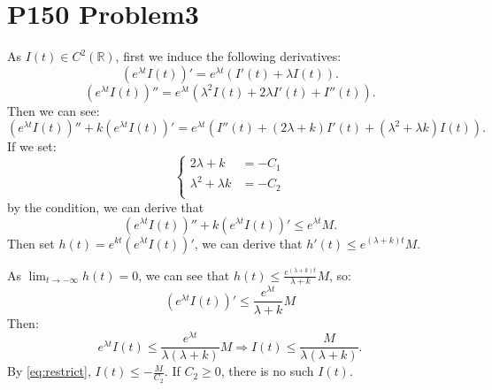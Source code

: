 \documentclass[a4paper]{ctexart}
\begin{document}
\section*{P150 Problem3}
As $I(t)\in C^{2}(\mathbb{R})$, first we induce the following derivatives:
\begin{equation}
    \label{eq:1orderdir}
    (e^{\lambda t}I(t))'=e^{\lambda t}(I'(t)+\lambda I(t)).
\end{equation}
\begin{equation}
    \label{eq:2orderdir}
    (e^{\lambda t}I(t))''=e^{\lambda t}(\lambda^{2}I(t)+2\lambda I'(t)+I''(t)).
\end{equation}
Then we can see:
\begin{equation}
    \label{eq:linearcomb}
    (e^{\lambda t}I(t))''+k(e^{\lambda t}I(t))'=e^{\lambda t}(I''(t)+(2\lambda+k)I'(t)+(\lambda^2+\lambda k)I(t)).
\end{equation}
If we set:
\begin{equation}
    \label{eq:restrict}
    \left\{
        \begin{aligned}
            2\lambda+k&=-C_1\\
            \lambda^2+\lambda k&=-C_2\\
        \end{aligned}
    \right.
\end{equation}
by the condition, we can derive that 
\begin{equation}
    \label{eq:firstint}
    (e^{\lambda t}I(t))''+k(e^{\lambda t}I(t))'\le e^{\lambda t}M.
\end{equation}
Then set $h(t)=e^{kt}(e^{\lambda t}I(t))'$, we can derive that $h'(t)\le e^{(\lambda+k)t}M$.

As $\lim_{t\rightarrow -\infty}h(t)=0$, we can see that $h(t)\le\frac{e^{(\lambda+k)t}}{\lambda+k}M$, so:
\begin{equation}
    (e^{\lambda t}I(t))'\le\frac{e^{\lambda t}}{\lambda+k}M
\end{equation}
Then:
\begin{equation}
    e^{\lambda t}I(t)\le\frac{e^{\lambda t}}{\lambda(\lambda+k)}M\Rightarrow I(t)\le\frac{M}{\lambda(\lambda+k)}.
\end{equation}
By \eqref{eq:restrict}, $I(t)\le-\frac{M}{C_{2}}$. If $C_{2}\ge 0$, there is no such $I(t)$.
\end{document}
